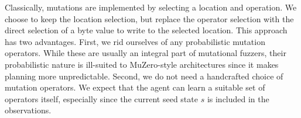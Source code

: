 Classically, mutations are implemented by selecting a location and operation.
We choose to keep the location selection, but replace the operator selection with
the direct selection of a byte value to write to the selected location.
This approach has two advantages.
First, we rid ourselves of any probabilistic mutation operators.
While these are usually an integral part of mutational fuzzers, their probabilistic
nature is ill-suited to MuZero-style architectures since it makes planning more unpredictable.
Second, we do not need a handcrafted choice of mutation operators.
We expect that the agent can learn a suitable set of operators itself,
especially since the current seed state $s$ is included in the
observations.
